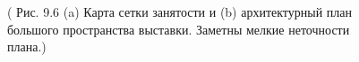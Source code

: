\documentclass[10pt,a4paper]{article}
\begin{document}
\begin{figure}[H]
	\caption{ ( Рис. 9.6 (a) Карта сетки занятости и (b) архитектурный план большого пространства выставки. Заметны мелкие неточности плана.)}
	\label{fig:96orig}
\end{figure}
\end{document}
